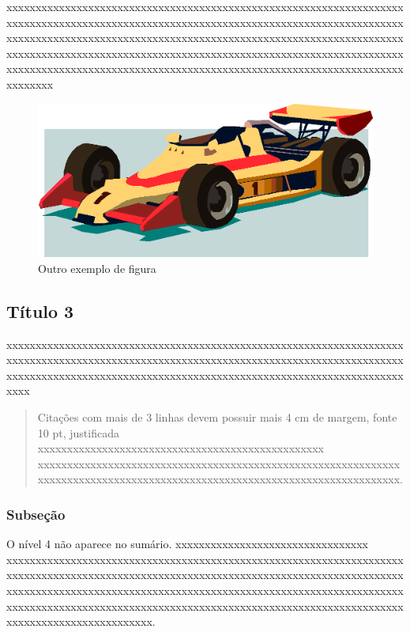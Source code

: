 xxxxxxxxxx\-xxxxxxxxxx\-xxxxxxxxxx\-xxxxxxxxxx\-xxxxxxxxxx\-xxxxxxxxxx\-xxxxxxxxxx\-xxxxxxxxxx\-xxxxxxxxxx\-xxxxxxxxxx\-xxxxxxxxxx\-xxxxxxxxxx\-xxxxxxxxxx\-xxxxxxxxxx\-xxxxxxxxxx\-xxxxxxxxxx\-xxxxxxxxxx\-xxxxxxxxxx\-xxxxxxxxxx\-xxxxxxxxxx\-xxxxxxxxxx\-xxxxxxxxxx\-xxxxxxxxxx\-xxxxxxxxxx\-xxxxxxxxxx\-xxxxxxxxxx\-xxxxxxxxxx\-xxxxxxxxxx\-xxxxxxxxxx\-xxxxxxxxxx\-xxxxxxxxxx\-xxxxxxxxxx\-xxxxxxxxxx\-xxxxxxxxxx\-xxxxxxxx

\begin{figure}[h]
    \centerline{\includegraphics{imagens/img-carro.png}}
    \caption{Outro exemplo de figura}
    \label{fig:carro}
\end{figure}

\subsection{Título 3}

xxxxxxxxxx\-xxxxxxxxxx\-xxxxxxxxxx\-xxxxxxxxxx\-xxxxxxxxxx\-xxxxxxxxxx\-xxxxxxxxxx\-xxxxxxxxxx\-xxxxxxxxxx\-xxxxxxxxxx\-xxxxxxxxxx\-xxxxxxxxxx\-xxxxxxxxxx\-xxxxxxxxxx\-xxxxxxxxxx\-xxxxxxxxxx\-xxxxxxxxxx\-xxxxxxxxxx\-xxxxxxxxxx\-xxxxxxxxxx\-xxxxxxxx

\begin{quote}Citações com mais de 3 linhas devem possuir mais 4 cm de margem, fonte 10 pt, justificada xxxxxxxxxx\-xxxxxxxxxx\-xxxxxxxxxx\-xxxxxxxxxx\-xxxxxxxxx xxxxxxxxxx\-xxxxxxxxxx\-xxxxxxxxxx\-xxxxxxxxxx\-xxxxxxxxxx\-xxxxxxxxxx\-xxxxxxxxxx\-xxxxxxxxxx\-xxxxxxxxxx\-xxxxxxxxxx\-xxxxxxxxxx\-xxxxxxxxxx\-xxxx.\end{quote}

\subsubsection{Subseção}

O nível 4 não aparece no sumário. xxxxxxxxxx\-xxxxxxxxxx\-xxxxxxxxxx\-xxx xxxxxxxxxx\-xxxxxxxxxx\-xxxxxxxxxx\-xxxxxxxxxx\-xxxxxxxxxx\-xxxxxxxxxx\-xxxxxxxxxx\-xxxxxxxxxx\-xxxxxxxxxx\-xxxxxxxxxx\-xxxxxxxxxx\-xxxxxxxxxx\-xxxxxxxxxx\-xxxxxxxxxx\-xxxxxxxxxx\-xxxxxxxxxx\-xxxxxxxxxx\-xxxxxxxxxx\-xxxxxxxxxx\-xxxxxxxxxx\-xxxxxxxxxx\-xxxxxxxxxx\-xxxxxxxxxx\-xxxxxxxxxx\-xxxxxxxxxx\-xxxxxxxxxx\-xxxxxxxxxx\-xxxxxxxxxx\-xxxxxxxxxx\-xxxxxxx.

